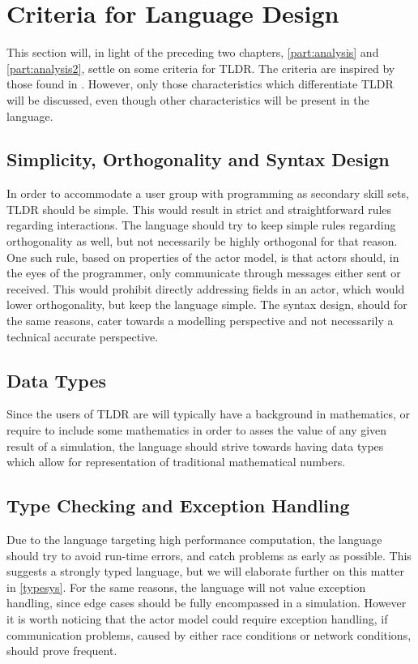 \section{Criteria for Language Design}\label{analsum}

This section will, in light of the preceding two chapters, \cref{part:analysis} and \cref{part:analysis2}, settle on some criteria for TLDR. The criteria are inspired by those found in \cite{sebesta2015concepts}. However, only those characteristics which differentiate TLDR will be discussed, even though other characteristics will be present in the language.


\subsection{Simplicity, Orthogonality and Syntax Design}

In order to accommodate a user group with programming as secondary skill sets, TLDR should be simple. This would result in strict and straightforward rules regarding interactions. The language should try to keep simple rules regarding orthogonality as well, but not necessarily be highly orthogonal for that reason. One such rule, based on properties of the actor model, is that actors should, in the eyes of the programmer, only communicate through messages either sent or received. This would prohibit directly addressing fields in an actor, which would lower orthogonality, but keep the language simple. The syntax design, should for the same reasons, cater towards a modelling perspective and not necessarily a technical accurate perspective.

\subsection{Data Types}

Since the users of TLDR are will typically have a background in mathematics, or require to include some mathematics in order to asses the value of any given result of a simulation, the language should strive towards having data types which allow for representation of traditional mathematical numbers.


\subsection{Type Checking and Exception Handling}

Due to the language targeting high performance computation, the language should try to avoid run-time errors, and catch problems as early as possible. This suggests a strongly typed language, but we will elaborate further on this matter in \cref{typesys}. For the same reasons, the language will not value exception handling, since edge cases should be fully encompassed in a simulation. However it is worth noticing that the actor model could require exception handling, if communication problems, caused by either race conditions or network conditions, should prove frequent.




